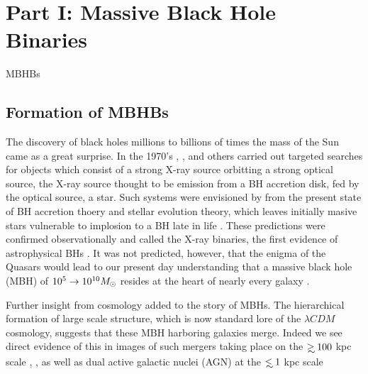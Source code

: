 \section{Part I: Massive Black Hole Binaries} %
MBHBs  \subsection{Formation of MBHBs}   
The discovery of black holes millions to billions of times the mass of the Sun
came as a great surprise. In the 1970's \cite{Giacconni}, \cite{Friedman}, and
others carried out targeted searches for objects which consist of a strong
X-ray source orbitting a strong optical source, the X-ray source thought to be
emission from a BH accretion disk, fed by the optical source, a star. Such
systems were envisioned by from the present state of BH accretion thoery and
stellar evolution theory, which leaves initially masive stars vulnerable to
implosion to a BH late in life \citep{}. These predictions were confirmed
observationally and called the X-ray binaries, the first evidence of
astrophysical BHs \citep{}. It was not predicted, however, that the enigma of
the Quasars \citep[\emph{e.g.}][]{Schmidt:19XX, Saltpeter:1964,
LyndenBell:1969} would lead to our present day understanding that a massive
black hole (MBH) of $10^5 \rightarrow 10^{10} {M_{\odot}}$ resides at the heart of
nearly every galaxy \citep{KR95, KHo2015, FerrareseFord:2005}.

Further insight from cosmology added to the story of MBHs. The hierarchical
formation of large scale structure, which is now standard lore of the $\lambda
CDM$ \citep{LCDM} cosmology, suggests that these MBH harboring galaxies merge.
Indeed we see direct evidence of this in images of such mergers taking place
on the $\gsim 100$ kpc scale \citep{Comerford:2013}, \citep[see also][and
references therein]{Dotti:2012:rev}, as well as dual active galactic nuclei
(AGN) at the $\lsim 1$ kpc scale \citep{Komossa:2003, Fabbiano+2011,
Rodriguez:2006, Burke- Spolaor:2011, ColpiDotti:2009, Gitti:2013, Woo:2014,
Andrade-Santos:2016}



